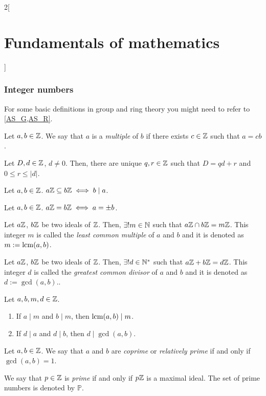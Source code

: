 \documentclass[../../../main.tex]{subfiles}
\begin{document}
\begin{multicols}{2}[\section{Fundamentals of mathematics}]
  \subsubsection{Integer numbers}
  For some basic definitions in group and ring theory you might need to refer to \cref{AS_G,AS_R}.
  \begin{definition}
    Let $a,b\in\mathbb{Z}$. We say that $a$ is a \emph{multiple} of $b$ if there exists $c\in\mathbb{Z}$ such that $a=cb$.
  \end{definition}
  \begin{theorem}
    Let $D,d\in\mathbb{Z}$, $d\ne 0$. Then, there are unique $q,r\in\mathbb{Z}$ such that $D=qd+r$ and $0\leq r\leq|d|$.
  \end{theorem}
  \begin{proposition}
    Let $a,b\in \mathbb{Z}$. $a\mathbb{Z}\subseteq b\mathbb{Z}\iff b\mid a$.
  \end{proposition}
  \begin{corollary}
    Let $a,b\in \mathbb{Z}$. $a\mathbb{Z}=b\mathbb{Z}\iff a=\pm b$.
  \end{corollary}
  \begin{proposition}
    Let $a\mathbb{Z}$, $b\mathbb{Z}$ be two ideals of $\mathbb{Z}$. Then, $\exists!m\in\mathbb{N}$ such that $a\mathbb{Z}\cap b\mathbb{Z}=m\mathbb{Z}$. This integer $m$ is called the \emph{least common multiple} of $a$ and $b$ and it is denoted as $m:=\operatorname{lcm}(a,b)$.
  \end{proposition}
  \begin{proposition}
    Let $a\mathbb{Z}$, $b\mathbb{Z}$ be two ideals of $\mathbb{Z}$. Then, $\exists!d\in\mathbb{N}^*$ such that $a\mathbb{Z}+b\mathbb{Z}=d\mathbb{Z}$. This integer $d$ is called the \emph{greatest common divisor} of $a$ and $b$ and it is denoted as $d:=\gcd(a,b)$..
  \end{proposition}
  \begin{proposition}
    Let $a,b,m,d\in\mathbb{Z}$.
    \begin{enumerate}
      \item If $a\mid m$ and $b\mid m$, then $\operatorname{lcm}(a,b)\mid m$.
      \item If $d\mid a$ and $d\mid b$, then $d\mid\gcd(a,b)$.
    \end{enumerate}
  \end{proposition}
  \begin{definition}
    Let $a,b\in\mathbb{Z}$. We say that $a$ and $b$ are \emph{coprime} or \emph{relatively prime} if and only if $\gcd(a,b)=1$.
  \end{definition}
  \begin{definition}
    We say that $p\in\mathbb{Z}$ is \emph{prime} if and only if $p\mathbb{Z}$ is a maximal ideal. The set of prime numbers is denoted by $\mathbb{P}$.

\end{definition}
\end{multicols}
\end{document}
